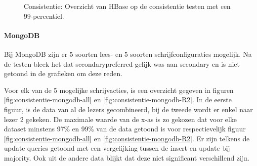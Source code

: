 \begin{figure}[ht!] 
	\centering

	\caption{Consistentie: Overzicht van HBase op de consistentie testen met een 99-percentiel.}
	\label{fig:consistentie-hbase}
\end{figure}

\paragraph{MongoDB} Bij MongoDB zijn er 5 soorten lees- en 5 soorten schrijfconfiguraties mogelijk. Na de testen bleek het dat secondarypreferred gelijk was aan secondary en is niet getoond in de grafieken om deze reden. 

Voor elk van de 5 mogelijke schrijvacties, is een overzicht gegeven in figuren \ref{fig:consistentie-mongodb-all} en \ref{fig:consistentie-mongodb-R2}. In de eerste figuur, is de data van al de lezers gecombineerd, bij de tweede wordt er enkel naar lezer 2 gekeken. De maximale waarde van de x-as is zo gekozen dat voor elke dataset minstens 97\% en 99\% van de data getoond is voor respectievelijk figuur \ref{fig:consistentie-mongodb-all} en \ref{fig:consistentie-mongodb-R2}. Er zijn telkens de update queries getoond met een vergelijking tussen de insert en update bij majority. Ook uit de andere data blijkt dat deze niet significant verschillend zijn. 

